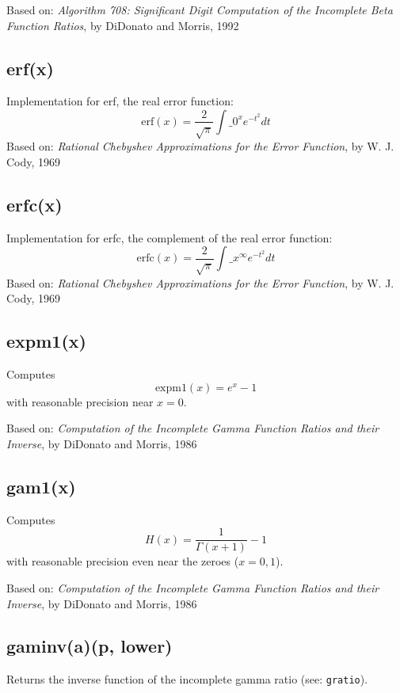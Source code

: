 \documentclass{article}
\begin{document}
Based on: \emph{Algorithm 708: Significant Digit Computation of the Incomplete Beta Function
Ratios}, by DiDonato and Morris, 1992


    \subsection*{erf(x)}
    Implementation for erf, the real error function:
$$\textrm{erf}(x) = \frac{2}{\sqrt{\pi}}\int\_0^x e^{-t^2} dt$$
Based on: \emph{Rational Chebyshev Approximations for the Error
Function}, by W. J. Cody, 1969


    \subsection*{erfc(x)}
    Implementation for erfc, the complement of the real error function:
$$\textrm{erfc}(x) = \frac{2}{\sqrt{\pi}}\int\_x^\infty e^{-t^2} dt$$
Based on: \emph{Rational Chebyshev Approximations for the Error
Function}, by W. J. Cody, 1969


    \subsection*{expm1(x)}
    Computes $$\textrm{expm1}(x) = e^x - 1$$ with reasonable precision near $x = 0$.


Based on:  \emph{Computation of the Incomplete Gamma Function Ratios
and their Inverse}, by DiDonato and Morris, 1986


    \subsection*{gam1(x)}
    Computes $$H(x)=\frac{1}{\Gamma(x+1)} - 1$$ with reasonable precision even near
the zeroes ($x = 0, 1$).


Based on:  \emph{Computation of the Incomplete Gamma Function Ratios
and their Inverse}, by DiDonato and Morris, 1986


    \subsection*{gaminv(a)(p, lower)}
    Returns the inverse function
of the incomplete gamma ratio (see: \texttt{gratio}).
\end{document}
